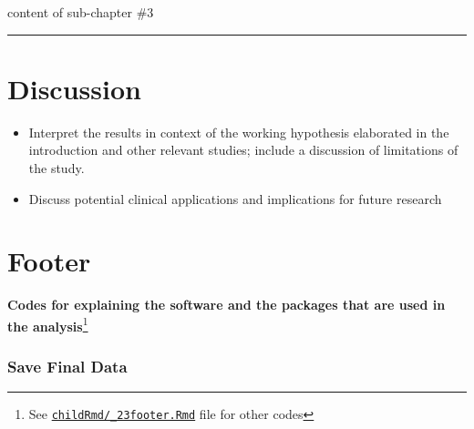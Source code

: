 \documentclass[
]{article}
\begin{document}
content of sub-chapter \#3

\begin{center}\rule{0.5\linewidth}{0.5pt}\end{center}

\pagebreak

\hypertarget{discussion}{%
\section{Discussion}\label{discussion}}

\begin{itemize}
\item
  Interpret the results in context of the working hypothesis elaborated
  in the introduction and other relevant studies; include a discussion
  of limitations of the study.
\item
  Discuss potential clinical applications and implications for future
  research
\end{itemize}

\pagebreak

\hypertarget{footer}{%
\section{Footer}\label{footer}}

\textbf{Codes for explaining the software and the packages that are used
in the analysis}\footnote{See
  \href{https://github.com/sbalci/histopathology-template/blob/master/childRmd/_23footer.Rmd}{\texttt{childRmd/\_23footer.Rmd}}
  file for other codes}

\hypertarget{save-final-data}{%
\subsubsection{Save Final Data}\label{save-final-data}}
\end{document}
